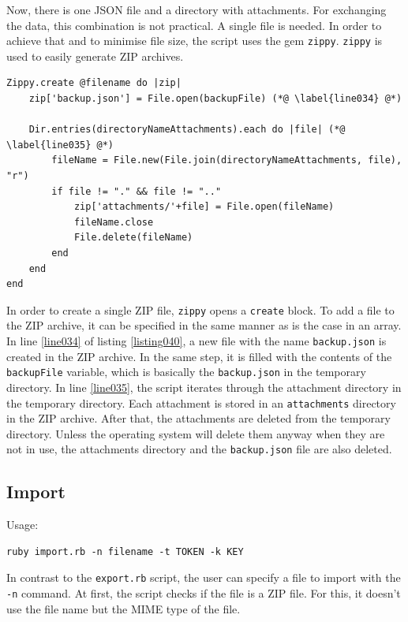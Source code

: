 Now, there is one JSON file and a directory with attachments. For exchanging the data, this combination is not practical. A single file is needed. In order to achieve that and to minimise file size, the script uses the gem \texttt{zippy}. \texttt{zippy} is used to easily generate ZIP archives. 

\begin{lstlisting}[aboveskip=1\baselineskip, caption=Creating a ZIP archive out of the backed up data., label=listing040]
Zippy.create @filename do |zip|
	zip['backup.json'] = File.open(backupFile) (*@ \label{line034} @*)

	Dir.entries(directoryNameAttachments).each do |file| (*@ \label{line035} @*)
		fileName = File.new(File.join(directoryNameAttachments, file), "r") 
		if file != "." && file != ".."
			zip['attachments/'+file] = File.open(fileName)
			fileName.close
			File.delete(fileName)
		end
	end
end
\end{lstlisting}

In order to create a single ZIP file, \texttt{zippy} opens a \lstinline{create} block. To add a file to the ZIP archive, it can be specified in the same manner as is the case in an array. In  line \ref{line034} of listing \ref{listing040}, a new file with the name \texttt{backup.json} is created in the ZIP archive. In the same step, it is filled with the contents of the \lstinline{backupFile} variable, which is basically the \texttt{backup.json} in the temporary directory. In line \ref{line035}, the script iterates through the attachment directory in the temporary directory. Each attachment is stored in an \texttt{attachments} directory in the ZIP archive. After that, the attachments are deleted from the temporary directory. Unless the operating system will delete them anyway when they are not in use, the attachments directory and the \texttt{backup.json} file are also deleted. \cite{zippy}




\subsection{Import}
Usage:
\begin{lstlisting}[aboveskip=1\baselineskip, style=bash, caption=\texttt{import.rb} usage., label=listing041]
ruby import.rb -n filename -t TOKEN -k KEY
\end{lstlisting}

In contrast to the \texttt{export.rb} script, the user can specify a file to import with the \texttt{-n} command. At first, the script checks if the file is a ZIP file. For this, it doesn't use the file name but the MIME type of the file.

